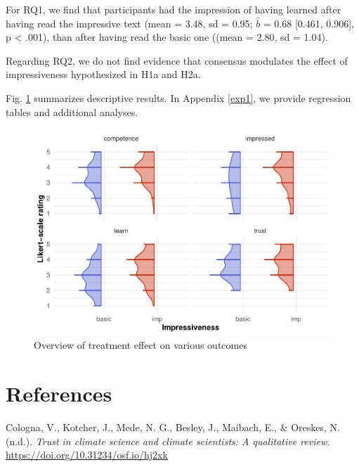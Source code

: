 \documentclass[
  doc,floatsintext]{apa6}
\newlength{\cslhangindent}
\newenvironment{CSLReferences}[2] %
 {\begin{list}{}{%
  \setlength{\itemindent}{0pt}
  \setlength{\leftmargin}{0pt}
  \setlength{\parsep}{0pt}
  \ifodd #1
   \setlength{\leftmargin}{\cslhangindent}
   \setlength{\itemindent}{-1\cslhangindent}
  \fi
  \setlength{\itemsep}{#2\baselineskip}}}
 {\end{list}}
\begin{document}
For RQ1, we find that participants had the impression of having learned after having read the impressive text (mean = 3.48, sd = 0.95; \(\hat{b}\) = 0.68 {[}0.461, 0.906{]}, p \textless{} .001), than after having read the basic one ((mean = 2.80, sd = 1.04).

Regarding RQ2, we do not find evidence that consensus modulates the effect of impressiveness hypothesized in H1a and H2a.

Fig. \ref{fig:exp1-plot} summarizes descriptive results. In Appendix \ref{exp1}, we provide regression tables and additional analyses.



\begin{figure}
\centering
\includegraphics{output/figures/exp1-plot.pdf}
\caption{\label{fig:exp1-plot}Overview of treatment effect on various outcomes}
\end{figure}

\FloatBarrier

\section{References}\label{references}

\label{refs}
\begin{CSLReferences}{1}{0}
Cologna, V., Kotcher, J., Mede, N. G., Besley, J., Maibach, E., \& Oreskes, N. (n.d.). \emph{Trust in climate science and climate scientists: A qualitative review}. \url{https://doi.org/10.31234/osf.io/hj2xk}

\end{CSLReferences}
\end{document}
